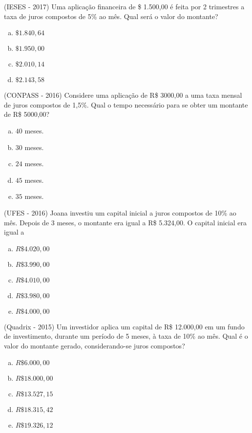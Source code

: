   \begin{exer}
  (IESES - 2017) Uma aplicação financeira de \$ 1.500,00 é feita por 2 trimestres a taxa de juros compostos de 5\% ao mês. Qual será o valor do montante?
  \begin{enumerate}[a)]
  \item $\$ 1.840,64$
  \item $\$ 1.950,00$
  \item $\$ 2.010,14$
  \item $\$ 2.143,58$
  \end{enumerate}
  \end{exer}

  \begin{exer}
  (CONPASS - 2016) Considere uma aplicação de R\$ 3000,00 a uma taxa mensal de juros compostos de 1,5\%. Qual o tempo necessário para se obter um montante de R\$ 5000,00?
  \begin{enumerate}[a)]
  \item $40$ meses.
  \item $30$ meses.
  \item $24$ meses.
  \item $45$ meses.
  \item $35$ meses.
  \end{enumerate}
  \end{exer}

  \begin{exer}
  (UFES - 2016) Joana investiu um capital inicial a juros compostos de 10\% ao mês. Depois de 3 meses, o montante era igual a R\$ 5.324,00. O capital inicial era igual a
  \begin{enumerate}[a)]
  \item $R\$ 4.020,00$
  \item $R\$ 3.990,00$
  \item $R\$ 4.010,00$
  \item $R\$ 3.980,00$
  \item $R\$ 4.000,00$
  \end{enumerate}
  \end{exer}

  \begin{exer}
  (Quadrix - 2015) Um investidor aplica um capital de R\$ 12.000,00 em um fundo de investimento, durante um período de 5 meses, à taxa de 10\% ao mês. Qual é o valor do montante gerado, considerando-se juros compostos?
  \begin{enumerate}[a)]
  \item $R\$ 6.000,00$
  \item $R\$ 18.000,00$
  \item $R\$ 13.527,15$
  \item $R\$ 18.315,42$
  \item $R\$ 19.326,12$
  \end{enumerate}
  \end{exer}
 




